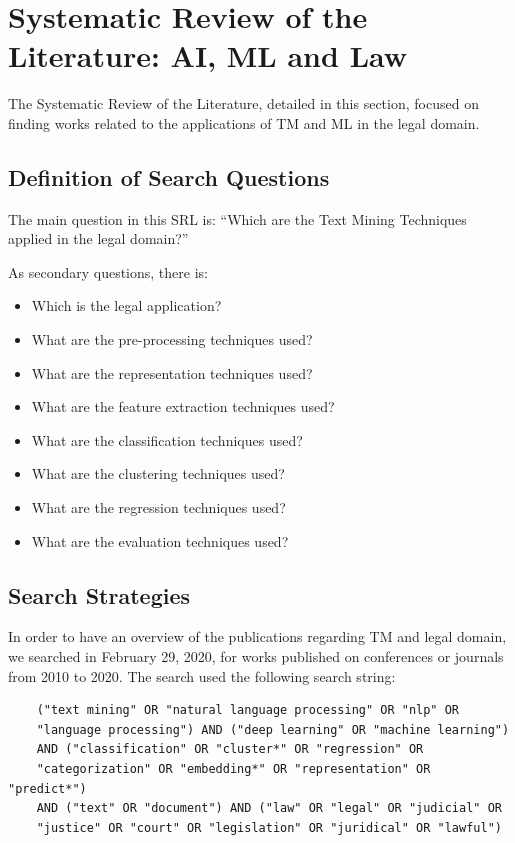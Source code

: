 \chapter{Systematic Review of the Literature: AI, ML and Law} \label{ap:rsl_ml_law}

The Systematic Review of the Literature, detailed in this section, focused on finding works related to the applications of TM and ML in the legal domain.


\section{Definition of Search Questions}

The main question in this SRL is: ``Which are the Text Mining Techniques applied in the legal domain?''

As secondary questions, there is:

\begin{itemize}[noitemsep]
    \item Which is the legal application?
    \item What are the pre-processing techniques used?
    \item What are the representation techniques used?
    \item What are the feature extraction techniques used?
    \item What are the classification techniques used?
    \item What are the clustering techniques used?
    \item What are the regression techniques used?
    \item What are the evaluation techniques used?
\end{itemize}

\section{Search Strategies}

In order to have an overview of the publications regarding TM and legal domain, we searched in February 29, 2020, for works published on conferences or journals from 2010 to 2020.  The search used the following search string:

\begin{verbatim}
    ("text mining" OR "natural language processing" OR "nlp" OR
    "language processing") AND ("deep learning" OR "machine learning")
    AND ("classification" OR "cluster*" OR "regression" OR 
    "categorization" OR "embedding*" OR "representation" OR "predict*")
    AND ("text" OR "document") AND ("law" OR "legal" OR "judicial" OR
    "justice" OR "court" OR "legislation" OR "juridical" OR "lawful")
\end{verbatim}

